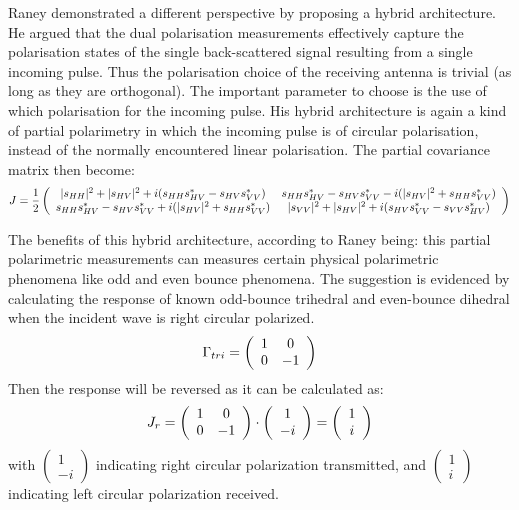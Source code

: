 Raney \cite{Raney_2006_IGARSS} demonstrated a different perspective by proposing a hybrid architecture.
He argued that the dual polarisation measurements effectively capture the polarisation states of the single back-scattered signal resulting from a single incoming pulse.
Thus the polarisation choice of the receiving antenna is trivial (as long as they are orthogonal).
The important parameter to choose is the use of which polarisation for the incoming pulse.
His hybrid architecture is again a kind of partial polarimetry in which the incoming pulse is of circular polarisation, instead of the normally encountered linear polarisation.
The partial covariance matrix then become:
\begin{equation}
J = \frac{1}{2} \left(	
\begin{array}{c c}
	|s_{HH}|^2 + |s_{HV}|^2 + i (s_{HH}s_{HV}^* - s_{HV}s_{VV}^*)
& 	s_{HH}s_{HV}^* - s_{HV}s_{VV}^* - i (|s_{HV}|^2 + s_{HH}s_{VV}^*)\\
	s_{HH}s_{HV}^* - s_{HV}s_{VV}^* + i (|s_{HV}|^2 + s_{HH}s_{VV}^*)
& 	|s_{VV}|^2 + |s_{HV}|^2 + i (s_{HV}s_{VV}^* - s_{VV}s_{HV}^*)
\end{array}
\right)
\end{equation}

The benefits of this hybrid architecture, according to Raney being:
	this partial polarimetric measurements can measures certain physical polarimetric phenomena like odd and even bounce phenomena.
The suggestion is evidenced by calculating the response of known odd-bounce trihedral and even-bounce dihedral when the incident wave is right circular polarized.
\begin{equation}
\Gamma_{tri} = \left(
\begin{array}{c c}
1 & 0 \\
0 & -1
\end{array}
\right)
\end{equation}
Then the response will be reversed as it can be calculated as:
\begin{equation}
J_r = \left(
\begin{array}{c c}
1 & 0 \\
0 & -1
\end{array}
\right) \cdot
\left(
\begin{array}{c}
1 \\
-i
\end{array}
\right) = \left(
\begin{array}{c}
1 \\
i
\end{array}
\right) 
\end{equation}
with
	$ \left( \begin{array}{c} 1 \\ -i \end{array} \right) $ indicating right circular polarization transmitted, and
	$ \left( \begin{array}{c} 1 \\ i \end{array} \right) $ indicating left circular polarization received.

